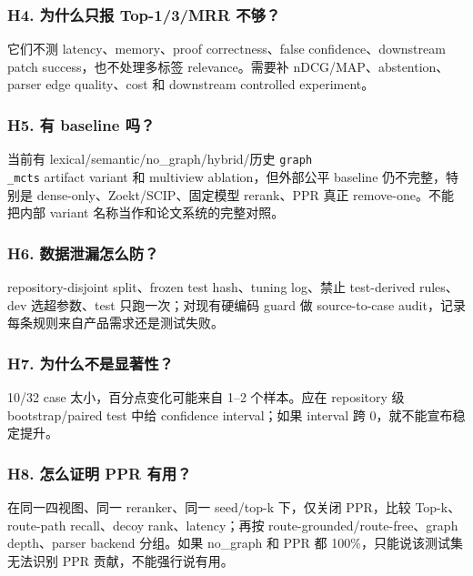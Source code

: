 \documentclass[UTF8,12pt,openany]{ctexbook}
\begin{document}
\subsubsection{H4. 为什么只报 Top-1/3/MRR 不够？}

它们不测 latency、memory、proof correctness、false confidence、downstream patch success，也不处理多标签 relevance。需要补 nDCG/MAP、abstention、parser edge quality、cost 和 downstream controlled experiment。\par

\subsubsection{H5. 有 baseline 吗？}

当前有 lexical/semantic/no\_graph/hybrid/历史 \texttt{graph\\_mcts} artifact variant 和 multiview ablation，但外部公平 baseline 仍不完整，特别是 dense-only、Zoekt/SCIP、固定模型 rerank、PPR 真正 remove-one。不能把内部 variant 名称当作和论文系统的完整对照。\par

\subsubsection{H6. 数据泄漏怎么防？}

repository-disjoint split、frozen test hash、tuning log、禁止 test-derived rules、dev 选超参数、test 只跑一次；对现有硬编码 guard 做 source-to-case audit，记录每条规则来自产品需求还是测试失败。\par

\subsubsection{H7. 为什么不是显著性？}

10/32 case 太小，百分点变化可能来自 1–2 个样本。应在 repository 级 bootstrap/paired test 中给 confidence interval；如果 interval 跨 0，就不能宣布稳定提升。\par

\subsubsection{H8. 怎么证明 PPR 有用？}

在同一四视图、同一 reranker、同一 seed/top-k 下，仅关闭 PPR，比较 Top-k、route-path recall、decoy rank、latency；再按 route-grounded/route-free、graph depth、parser backend 分组。如果 no\_graph 和 PPR 都 100\%，只能说该测试集无法识别 PPR 贡献，不能强行说有用。\par
\end{document}
